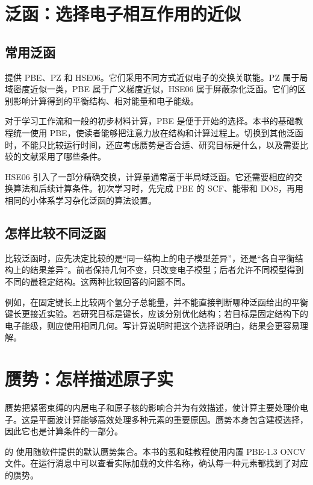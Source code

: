 \section{泛函：选择电子相互作用的近似}

\subsection{常用泛函}

 提供 PBE、PZ 和 HSE06。它们采用不同方式近似电子的交换关联能。PZ 属于局域密度近似一类，PBE 属于广义梯度近似，HSE06 属于屏蔽杂化泛函。它们的区别影响计算得到的平衡结构、相对能量和电子能级。

对于学习工作流和一般的初步材料计算，PBE 是便于开始的选择。本书的基础教程统一使用 PBE，使读者能够把注意力放在结构和计算过程上。切换到其他泛函时，不能只比较运行时间，还应考虑赝势是否合适、研究目标是什么，以及需要比较的文献采用了哪些条件。

HSE06 引入了一部分精确交换，计算量通常高于半局域泛函。它还需要相应的交换算法和后续计算条件。初次学习时，先完成 PBE 的 SCF、能带和 DOS，再用相同的小体系学习杂化泛函的算法设置。

\subsection{怎样比较不同泛函}

比较泛函时，应先决定比较的是“同一结构上的电子模型差异”，还是“各自平衡结构上的结果差异”。前者保持几何不变，只改变电子模型；后者允许不同模型得到不同的最稳定结构。这两种比较回答的问题不同。

例如，在固定键长上比较两个氢分子总能量，并不能直接判断哪种泛函给出的平衡键长更接近实验。若研究目标是键长，应该分别优化结构；若目标是固定结构下的电子能级，则应使用相同几何。写计算说明时把这个选择说明白，结果会更容易理解。

\section{赝势：怎样描述原子实}

赝势把紧密束缚的内层电子和原子核的影响合并为有效描述，使计算主要处理价电子。这是平面波计算能够高效处理多种元素的重要原因。赝势本身包含建模选择，因此它也是计算条件的一部分。

 的  使用随软件提供的默认赝势集合。本书的氢和硅教程使用内置 PBE-1.3 ONCV 文件。在运行消息中可以查看实际加载的文件名称，确认每一种元素都找到了对应的赝势。

